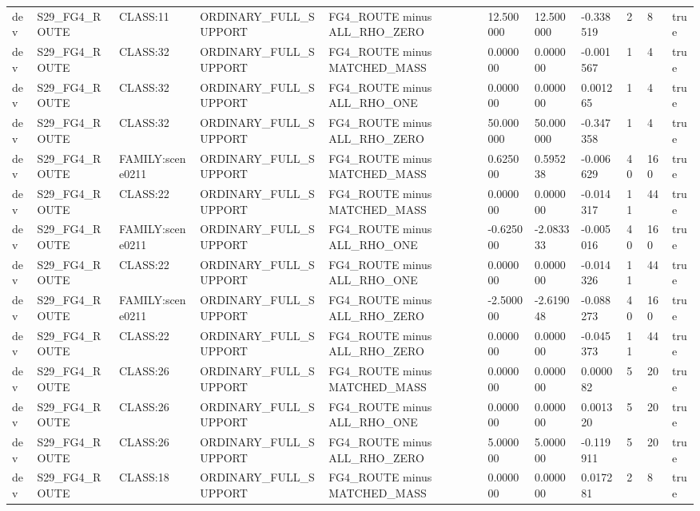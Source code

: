 \begin{tabular}{lllllllllll}
dev & S29\_FG4\_ROUTE & CLASS:11 & ORDINARY\_FULL\_SUPPORT & FG4\_ROUTE minus ALL\_RHO\_ZERO & 12.500000 & 12.500000 & -0.338519 & 2 & 8 & true \\
dev & S29\_FG4\_ROUTE & CLASS:32 & ORDINARY\_FULL\_SUPPORT & FG4\_ROUTE minus MATCHED\_MASS & 0.000000 & 0.000000 & -0.001567 & 1 & 4 & true \\
dev & S29\_FG4\_ROUTE & CLASS:32 & ORDINARY\_FULL\_SUPPORT & FG4\_ROUTE minus ALL\_RHO\_ONE & 0.000000 & 0.000000 & 0.001265 & 1 & 4 & true \\
dev & S29\_FG4\_ROUTE & CLASS:32 & ORDINARY\_FULL\_SUPPORT & FG4\_ROUTE minus ALL\_RHO\_ZERO & 50.000000 & 50.000000 & -0.347358 & 1 & 4 & true \\
dev & S29\_FG4\_ROUTE & FAMILY:scene0211 & ORDINARY\_FULL\_SUPPORT & FG4\_ROUTE minus MATCHED\_MASS & 0.625000 & 0.595238 & -0.006629 & 40 & 160 & true \\
dev & S29\_FG4\_ROUTE & CLASS:22 & ORDINARY\_FULL\_SUPPORT & FG4\_ROUTE minus MATCHED\_MASS & 0.000000 & 0.000000 & -0.014317 & 11 & 44 & true \\
dev & S29\_FG4\_ROUTE & FAMILY:scene0211 & ORDINARY\_FULL\_SUPPORT & FG4\_ROUTE minus ALL\_RHO\_ONE & -0.625000 & -2.083333 & -0.005016 & 40 & 160 & true \\
dev & S29\_FG4\_ROUTE & CLASS:22 & ORDINARY\_FULL\_SUPPORT & FG4\_ROUTE minus ALL\_RHO\_ONE & 0.000000 & 0.000000 & -0.014326 & 11 & 44 & true \\
dev & S29\_FG4\_ROUTE & FAMILY:scene0211 & ORDINARY\_FULL\_SUPPORT & FG4\_ROUTE minus ALL\_RHO\_ZERO & -2.500000 & -2.619048 & -0.088273 & 40 & 160 & true \\
dev & S29\_FG4\_ROUTE & CLASS:22 & ORDINARY\_FULL\_SUPPORT & FG4\_ROUTE minus ALL\_RHO\_ZERO & 0.000000 & 0.000000 & -0.045373 & 11 & 44 & true \\
dev & S29\_FG4\_ROUTE & CLASS:26 & ORDINARY\_FULL\_SUPPORT & FG4\_ROUTE minus MATCHED\_MASS & 0.000000 & 0.000000 & 0.000082 & 5 & 20 & true \\
dev & S29\_FG4\_ROUTE & CLASS:26 & ORDINARY\_FULL\_SUPPORT & FG4\_ROUTE minus ALL\_RHO\_ONE & 0.000000 & 0.000000 & 0.001320 & 5 & 20 & true \\
dev & S29\_FG4\_ROUTE & CLASS:26 & ORDINARY\_FULL\_SUPPORT & FG4\_ROUTE minus ALL\_RHO\_ZERO & 5.000000 & 5.000000 & -0.119911 & 5 & 20 & true \\
dev & S29\_FG4\_ROUTE & CLASS:18 & ORDINARY\_FULL\_SUPPORT & FG4\_ROUTE minus MATCHED\_MASS & 0.000000 & 0.000000 & 0.017281 & 2 & 8 & true \\

\end{tabular}

